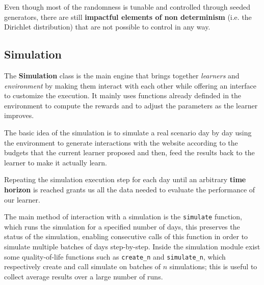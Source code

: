 Even though most of the randomness is tunable and controlled through seeded generators, there are still \textbf{impactful elements of non determinism} (i.e. the Dirichlet distribution) that are not possible to control in any way.

\subsection{Simulation}

The \textbf{Simulation} class is the main engine that brings together \textit{learners} and \textit{environment} by making them interact with each other while offering an interface to customize the execution. It mainly uses functions already definded in the environment to compute the rewards and to adjust the parameters as the learner improves.

The basic idea of the simulation is to simulate a real scenario day by day using the environment to generate interactions with the website according to the budgets that the current learner proposed and then, feed the results back to the learner to make it actually learn.

Repeating the simulation execution step for each day until an arbitrary \textbf{time horizon} is reached grants us all the data needed to evaluate the performance of our learner.

The main method of interaction with a simulation is the \texttt{simulate} function, which runs the simulation for a specified number of days, this preserves the status of the simulation, enabling consecutive calls of this function in order to simulate multiple batches of days step-by-step.
Inside the simulation module exist some quality-of-life functions such as \texttt{create\_n} and \texttt{simulate\_n}, which respectively create and call simulate on batches of $n$ simulations; this is useful to collect average results over a large number of runs.

